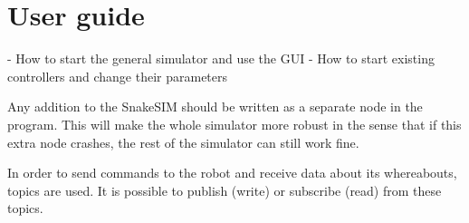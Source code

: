 \section{User guide}

- How to start the general simulator and use the GUI
- How to start existing controllers and change their parameters

Any addition to the SnakeSIM should be written as a separate node in the program. This will make the whole simulator more robust in the sense that if this extra node crashes, the rest of the simulator can still work fine.

In order to send commands to the robot and receive data about its whereabouts, topics are used. It is possible to publish (write) or subscribe (read) from these topics. 